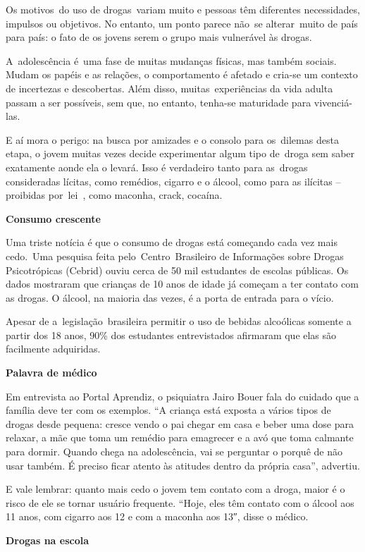 \begin{itemize}
\begin{itemize}
{\begin{itemize}
\begin{itemize}
Os motivos~do uso de drogas~variam muito e pessoas têm diferentes
necessidades, impulsos ou objetivos. No entanto, um ponto parece não~se
alterar~muito de país para país: o fato de os jovens serem o grupo mais
vulnerável às drogas.

A~adolescência é~uma fase de muitas mudanças físicas, mas também
sociais. Mudam os papéis e as relações, o comportamento é afetado e
cria-se um contexto de incertezas e descobertas. Além disso,
muitas~experiências da vida adulta passam a ser possíveis, sem que, no
entanto, tenha-se maturidade para vivenciá-las.

E aí mora o perigo: na busca por amizades e o consolo para os~dilemas
desta etapa, o jovem muitas vezes decide experimentar algum tipo
de~droga sem saber exatamente aonde ela o levará. Isso é verdadeiro
tanto para as~drogas consideradas lícitas, como remédios, cigarro e o
álcool, como para as ilícitas -- proibidas por~lei~, como maconha,
crack, cocaína.

\textbf{Consumo crescente}

Uma triste notícia é que o consumo de drogas está começando cada vez
mais cedo.~Uma pesquisa feita pelo~Centro~Brasileiro de Informações
sobre Drogas Psicotrópicas (Cebrid) ouviu cerca de 50 mil estudantes de
escolas públicas. Os dados mostraram que crianças de 10 anos de idade já
começam a ter contato com as drogas. O álcool, na maioria das vezes, é a
porta de entrada para o vício.

Apesar de a~legislação~brasileira permitir o uso de bebidas alcoólicas
somente a partir dos 18 anos, 90\% dos estudantes entrevistados
afirmaram que elas são facilmente adquiridas.

\textbf{Palavra de médico}

Em entrevista ao Portal Aprendiz, o psiquiatra Jairo Bouer fala do
cuidado que a família deve ter com os exemplos. ``A criança está exposta
a vários tipos de drogas desde pequena: cresce vendo o pai chegar em
casa e beber uma dose para relaxar, a mãe que toma um remédio para
emagrecer e a avó que toma calmante para dormir. Quando chega na
adolescência, vai se perguntar o porquê de não usar também. É preciso
ficar atento às atitudes dentro da própria casa'', advertiu.

E vale lembrar: quanto mais cedo o jovem tem contato com a droga, maior
é o risco de ele se tornar usuário frequente. ``Hoje, eles têm contato
com o álcool aos 11 anos, com cigarro aos 12 e com a maconha aos 13″,
disse o médico.

\textbf{Drogas na escola}


\end{itemize}
\end{itemize}}
\end{itemize}
\end{itemize}
